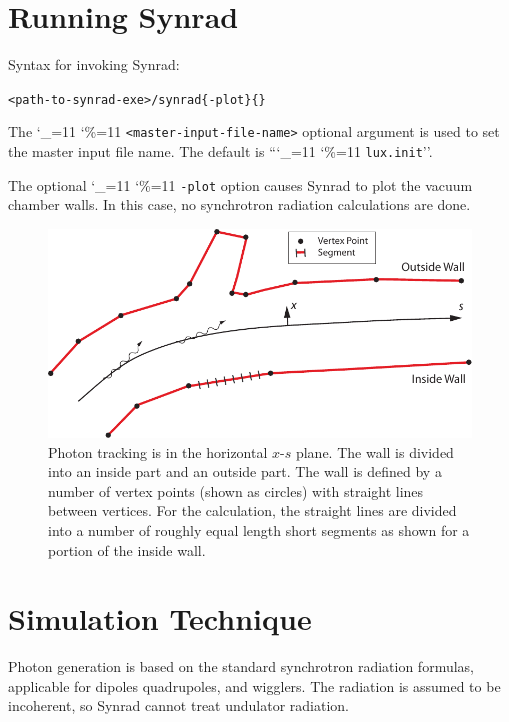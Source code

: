 \documentclass[11pt]{article}
\newcommand\ttcmd{\begingroup\catcode`\_=11 \catcode`\%=11 \dottcmd}
\newcommand\dottcmd[1]{\texttt{#1}\endgroup}
\newcommand{\vn}{\ttcmd}
\newenvironment{example}
  {\vspace{-3.0ex} \begin{alltt}}
  {\end{alltt} \vspace{-2.5ex}}
\begin{document}
\section{Running Synrad}
\label{s:run}

Syntax for invoking Synrad:
\begin{example}
  <path-to-synrad-exe>/synrad \{-plot\} \{<master-input-file-name>\}
\end{example}
The \vn{<master-input-file-name>} optional argument is used to set the
master input file name. The default is ``\vn{lux.init}''.

The optional \vn{-plot} option causes Synrad to plot the vacuum
chamber walls. In this case, no synchrotron radiation calculations are
done.


  \begin{figure}[tb]
  \begin{center}
  \includegraphics[width=5in]{wall.pdf}
  \caption{
Photon tracking is in the horizontal $x$-$s$ plane. The wall is
divided into an inside part and an outside part. The wall is defined
by a number of vertex points (shown as circles) with straight lines
between vertices. For the calculation, the straight lines are divided
into a number of roughly equal length short segments as shown for
a portion of the inside wall.
  }
  \label{f:wall}
  \end{center}
  \end{figure}

\section{Simulation Technique} 

Photon generation is based on the standard synchrotron radiation
formulas, applicable for dipoles quadrupoles, and wigglers. The
radiation is assumed to be incoherent, so Synrad cannot treat
undulator radiation. 
\end{document}
